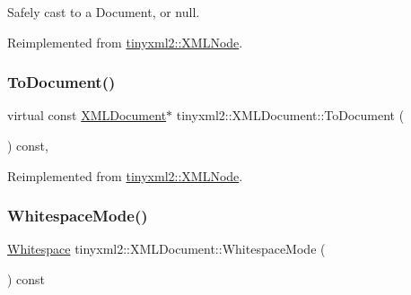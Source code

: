 Safely cast to a Document, or null. 



Reimplemented from \hyperlink{classtinyxml2_1_1_x_m_l_node_a836e2966ed736fc3c94f70e12a2a3357}{tinyxml2\+::\+X\+M\+L\+Node}.

\mbox{\label{classtinyxml2_1_1_x_m_l_document_a747ab173887d969fe313b4617f968e99}} 
\subsubsection{\texorpdfstring{To\+Document()}{ToDocument()}\hspace{0.1cm}{\footnotesize\ttfamily [2/2]}}
{\footnotesize\ttfamily virtual const \hyperlink{classtinyxml2_1_1_x_m_l_document}{X\+M\+L\+Document}$\ast$ tinyxml2\+::\+X\+M\+L\+Document\+::\+To\+Document (\begin{DoxyParamCaption}{ }\end{DoxyParamCaption}) const\hspace{0.3cm}{\ttfamily [inline]}, {\ttfamily [virtual]}}



Reimplemented from \hyperlink{classtinyxml2_1_1_x_m_l_node_ae8a5250331a5f12e10843fcb5ef3ef0b}{tinyxml2\+::\+X\+M\+L\+Node}.

\mbox{\label{classtinyxml2_1_1_x_m_l_document_a810ce508e6e0365497c2a9deb83c9ca7}} 
\subsubsection{\texorpdfstring{Whitespace\+Mode()}{WhitespaceMode()}}
{\footnotesize\ttfamily \hyperlink{namespacetinyxml2_a7f91d00f77360f850fd5da0861e27dd5}{Whitespace} tinyxml2\+::\+X\+M\+L\+Document\+::\+Whitespace\+Mode (\begin{DoxyParamCaption}{ }\end{DoxyParamCaption}) const\hspace{0.3cm}{\ttfamily [inline]}}



